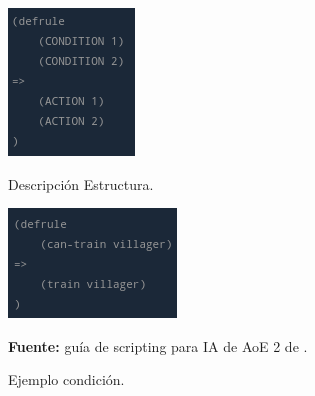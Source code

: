 \begin{figure}[ht]
\centering
\begin{minipage}[c]{0.45\linewidth}
	\hspace{9mm}
	\includegraphics[height=0.15\textheight]{imagenes/marco_teo/referentes/aoe_scripting_1.png}
	\caption{Descripción Estructura.}
	\label{img:aoe_script_1}
\end{minipage}
\begin{minipage}[c]{0.45\linewidth}
	\hspace{9mm}
	\includegraphics[height=0.15\textheight]{imagenes/marco_teo/referentes/aoe_scripting_2.png}
	\caption{Ejemplo condición.}
	\label{img:aoe_script_2}
\end{minipage}
\textbf{Fuente:} guía de scripting para \ac{IA} de \ac{AoE} 2 de \citeauthor*{redmechanic2017}.
\label{img:aoe_scripting_1}	
\end{figure}


